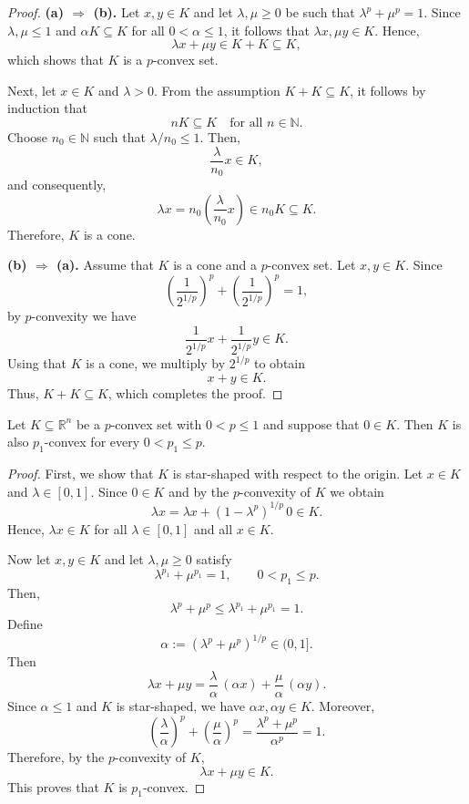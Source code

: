 \documentclass[10pt]{article}
\begin{document}
\begin{proof}
\noindent\textbf{(a) $\Rightarrow$ (b).}
Let $x,y \in K$ and let $\lambda,\mu \geq 0$ be such that $\lambda^{p} + \mu^{p} = 1$.  
Since $\lambda, \mu \leq 1$ and $\alpha K \subseteq K$ for all $0<\alpha\leq 1$, it follows that
$\lambda x, \mu y \in K$. Hence,
\[
\lambda x + \mu y \in K + K \subseteq K,
\]
which shows that $K$ is a $p$-convex set.

Next, let $x \in K$ and $\lambda > 0$. From the assumption $K+K \subseteq K$, it follows by induction that
\[
nK \subseteq K \quad \text{for all } n \in \mathbb{N}.
\]
Choose $n_{0} \in \mathbb{N}$ such that $\lambda / n_{0} \leq 1$. Then,
\[
\frac{\lambda}{n_{0}} x \in K,
\]
and consequently,
\[
\lambda x = n_{0}\left(\frac{\lambda}{n_{0}} x\right) \in n_{0}K \subseteq K.
\]
Therefore, $K$ is a cone.

\medskip
\noindent\textbf{(b) $\Rightarrow$ (a).}
Assume that $K$ is a cone and a $p$-convex set. Let $x,y \in K$.  
Since
\[
\left(\frac{1}{2^{1/p}}\right)^{p} + \left(\frac{1}{2^{1/p}}\right)^{p} = 1,
\]
by $p$-convexity we have
\[
\frac{1}{2^{1/p}}x + \frac{1}{2^{1/p}}y \in K.
\]
Using that $K$ is a cone, we multiply by $2^{1/p}$ to obtain
\[
x + y \in K.
\]
Thus, $K + K \subseteq K$, which completes the proof.
\end{proof}

 \begin{theorem}\label{multiple-p-convexity}
Let $K \subseteq \mathbb{R}^{n}$ be a $p$-convex set with $0 < p \leq 1$ and suppose that $0 \in K$.
Then $K$ is also $p_{1}$-convex for every $0 < p_{1} \leq p$.
\end{theorem}

\begin{proof}
First, we show that $K$ is star-shaped with respect to the origin.
Let $x \in K$ and $\lambda \in [0,1]$. Since $0 \in K$ and by the $p$-convexity of $K$ we obtain
\[
\lambda x
= \lambda x + (1-\lambda^{p})^{1/p} \, 0 \in K.
\]
Hence, $\lambda x \in K$ for all $\lambda \in [0,1]$ and all $x \in K$.

Now let $x,y \in K$ and let $\lambda,\mu \geq 0$ satisfy
\[
\lambda^{p_{1}} + \mu^{p_{1}} = 1,
\qquad 0 < p_{1} \leq p.
\]
Then,
\[
\lambda^{p} + \mu^{p} \leq \lambda^{p_{1}} + \mu^{p_{1}} = 1.
\]
Define
\[
\alpha := (\lambda^{p} + \mu^{p})^{1/p} \in (0,1].
\]
Then
\[
\lambda x + \mu y
= \frac{\lambda}{\alpha} \, (\alpha x) + \frac{\mu}{\alpha} \, (\alpha y).
\]
Since $\alpha \leq 1$ and $K$ is star-shaped, we have $\alpha x, \alpha y \in K$.
Moreover,
\[
\left(\frac{\lambda}{\alpha}\right)^{p} + \left(\frac{\mu}{\alpha}\right)^{p}
= \frac{\lambda^{p} + \mu^{p}}{\alpha^{p}} = 1.
\]
Therefore, by the $p$-convexity of $K$,
\[
\lambda x + \mu y \in K.
\]
This proves that $K$ is $p_{1}$-convex.
\end{proof}
\end{document}
